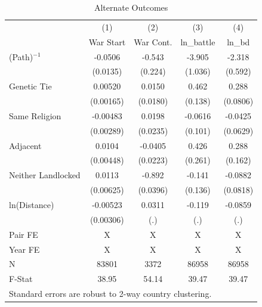 \documentclass{article}
\begin{document}
\begin{table}[htbp]\centering
\caption{Alternate Outcomes\label{tab:AltOutcomes}}
\begin{tabular}{l*{4}{c}}
\toprule
                    &\multicolumn{1}{c}{(1)}&\multicolumn{1}{c}{(2)}&\multicolumn{1}{c}{(3)}&\multicolumn{1}{c}{(4)}\\
                    &\multicolumn{1}{c}{War Start}&\multicolumn{1}{c}{War Cont.}&\multicolumn{1}{c}{ln\_battle}&\multicolumn{1}{c}{ln\_bd}\\
\midrule
(Path)$^{-1}$       &     -0.0506&      -0.543&      -3.905&      -2.318\\
                    &    (0.0135)&     (0.224)&     (1.036)&     (0.592)\\
\addlinespace
Genetic Tie         &     0.00520&      0.0150&       0.462&       0.288\\
                    &   (0.00165)&    (0.0180)&     (0.138)&    (0.0806)\\
\addlinespace
Same Religion       &    -0.00483&      0.0198&     -0.0616&     -0.0425\\
                    &   (0.00289)&    (0.0235)&     (0.101)&    (0.0629)\\
\addlinespace
Adjacent            &      0.0104&     -0.0405&       0.426&       0.288\\
                    &   (0.00448)&    (0.0223)&     (0.261)&     (0.162)\\
\addlinespace
Neither Landlocked  &      0.0113&      -0.892&      -0.141&     -0.0882\\
                    &   (0.00625)&    (0.0396)&     (0.136)&    (0.0818)\\
\addlinespace
ln(Distance)        &    -0.00523&      0.0311&      -0.119&     -0.0859\\
                    &   (0.00306)&         (.)&         (.)&         (.)\\
\midrule
Pair FE             &           X&           X&           X&           X\\
Year FE             &           X&           X&           X&           X\\
N                   &       83801&        3372&       86958&       86958\\
F-Stat              &       38.95&       54.14&       39.47&       39.47\\
\bottomrule
\multicolumn{5}{l}{\footnotesize Standard errors are robust to 2-way country clustering.}\\
\end{tabular}
\end{table}
\end{document}
